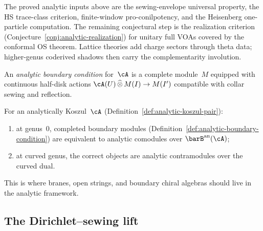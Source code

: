 \begin{remark}%
\label{rem:analytic-execution-order}%
%
The proved analytic inputs above are the sewing-envelope universal
property, the HS trace-class criterion, finite-window
pro-conilpotency, and the Heisenberg one-particle computation. The
remaining conjectural step is the realization criterion
(Conjecture~\ref{conj:analytic-realization}) for unitary full VOAs
covered by the conformal OS theorem. Lattice theories add charge
sectors through theta data; higher-genus coderived shadows then carry
the complementarity involution.
\end{remark}

\begin{definition}%
\label{def:analytic-boundary-condition}%
%
An \emph{analytic boundary condition} for~$\cA$ is a complete
module~$M$ equipped with continuous half-disk actions
$\cA(U) \,\widehat{\otimes}\, M(I) \to M(I')$
compatible with collar sewing and reflection.
\end{definition}

\begin{conjecture}\label{conj:boundary-bar-duality}%
%
For an analytically Koszul~$\cA$
\textup{(}Definition~\textup{\ref{def:analytic-koszul-pair}}\textup{)}:
\begin{enumerate}[label=\textup{(\roman*)}]
\item at genus~$0$, completed boundary modules
 \textup{(}Definition~\textup{\ref{def:analytic-boundary-condition}}\textup{)}
 are equivalent to analytic comodules over
 $\barB^{\mathrm{an}}(\cA)$;
\item at curved genus, the correct objects are analytic contramodules
 over the curved dual.
\end{enumerate}
This is where branes, open strings, and boundary chiral algebras
should live in the analytic framework.
\end{conjecture}

\subsection{The Dirichlet--sewing lift}%
\label{subsec:arithmetic-sewing-face}%
\label{subsec:dirichlet-sewing-lift}%
%

